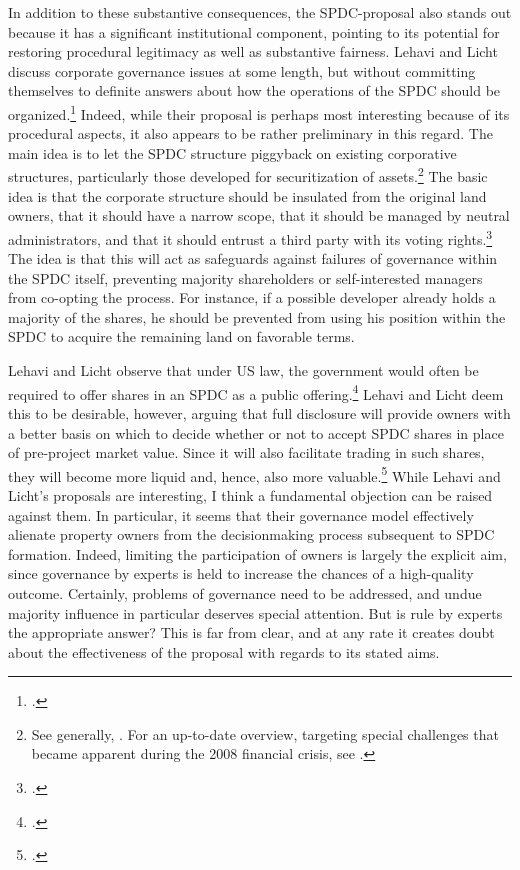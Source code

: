 In addition to these substantive consequences, the SPDC-proposal also stands out because it has a significant institutional component, pointing to its potential for restoring procedural legitimacy as well as substantive fairness. Lehavi and Licht discuss corporate governance issues at some length, but without committing themselves to definite answers about how the operations of the SPDC should be organized.\footcite[1040-1048]{lehavi07} Indeed, while their proposal is perhaps most interesting because of its procedural aspects, it also appears to be rather preliminary in this regard. The main idea is to let the SPDC structure piggyback on existing corporative structures, particularly those developed for securitization of assets.\footnote{See generally, \cite{schwarz94}. For an up-to-date overview, targeting special challenges that became apparent during the 2008 financial crisis, see \cite{schwarz13}.} The basic idea is that the corporate structure should be insulated from the original land owners, that it should have a narrow scope, that it should be managed by neutral administrators, and that it should entrust a third party with its voting rights.\footcite[1742]{legavi07} The idea is that this will act as safeguards against failures of governance within the SPDC itself, preventing majority shareholders or self-interested managers from co-opting the process. For instance, if a possible developer already holds a majority of the shares, he should be prevented from using his position within the SPDC to acquire the remaining land on favorable terms. 

Lehavi and Licht observe that under US law, the government would often be required to offer shares in an SPDC as a public offering.\footcite[1745]{lehavi07} Lehavi and Licht deem this to be desirable, however, arguing that full disclosure will provide owners with a better basis on which to decide whether or not to accept SPDC shares in place of pre-project market value. Since it will also facilitate trading in such shares, they will become more liquid and, hence, also more valuable.\footcite[1746]{lehavi06} While Lehavi and Licht's proposals are interesting, I think a fundamental objection can be raised against them. In particular, it seems that their governance model effectively alienate property owners from the decisionmaking process subsequent to SPDC formation. Indeed, limiting the participation of owners is largely the explicit aim, since governance by experts is held to increase the chances of a high-quality outcome. Certainly, problems of governance need to be addressed, and undue majority influence in particular deserves special attention. But is rule by experts the appropriate answer?  This is far from clear, and at any rate it creates doubt about the effectiveness of the proposal with regards to its stated aims.

